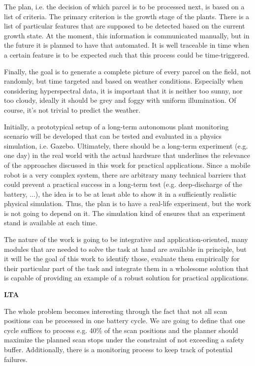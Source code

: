 \documentclass[german, master, expose, latin1]{base/thesis_KBS}
\begin{document}
The plan, i.e. the decision of which parcel is to be processed next, is based on a list of criteria. The primary criterion is the growth stage of the plants.
There is a list of particular features that are supposed to be detected based on the current growth state.
At the moment, this information is communicated manually, but in the future it is planned to have that automated.
It is well traceable in time when a certain feature is to be expected such that this process could be time-triggered.\newline

Finally, the goal is to generate a complete picture of every parcel on the field, not randomly, but time targeted and based on weather conditions. 
Especially when considering hyperspectral data, it is important that it is neither too sunny, nor too cloudy, ideally it should be grey and foggy with uniform illumination.
Of course, it's not trivial to predict the weather.\newline

Initially, a prototypical setup of a long-term autonomous plant monitoring scenario will be developed that can be tested and evaluated 
in a physics simulation, i.e. Gazebo. Ultimately, there should be a long-term experiment (e.g. one day) in the real world with the actual hardware that
underlines the relevance of the approaches discussed in this work for practical applications. Since a mobile robot is a very complex system, there are arbitrary many 
technical barriers that could prevent a practical success in a long-term test (e.g. deep-discharge of the battery, ...), the idea is to be at least able to show 
it in a sufficiently realistic physical simulation. Thus, the plan is to have a real-life experiment, but the work is not going to depend on it.
The simulation kind of ensures that an experiment stand is available at each time.\newline

The nature of the work is going to be integrative and application-oriented, many modules that are needed to solve the task at hand are available in principle, 
but it will be the goal of this work to identify those, evaluate them empirically for their particular part of the task and integrate them in a wholesome 
solution that is capable of providing an example of a robust solution for practical applications.\newline

\textbf{LTA}\newline

The whole problem becomes interesting through the fact that not all scan positions can be processed in one battery cycle.
We are going to define that one cycle suffices to process e.g. 40\% of the scan positions and the planner should maximize the planned scan stops under the
constraint of not exceeding a safety buffer. Additionally, there is a monitoring process to keep track of potential failures.\newline
\end{document}
